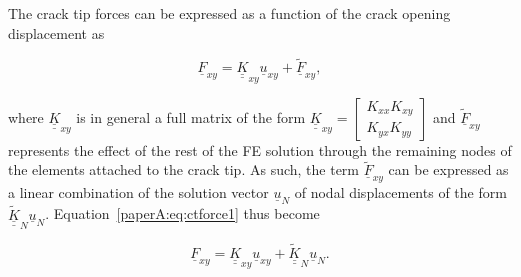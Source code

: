 The crack tip forces can be expressed as a function of the crack opening displacement as

\begin{equation}\label{paperA:eq:ctforce1}
\underline{F}_{xy}=\underline{\underline{K}}_{xy}\underline{u}_{xy}+\underline{\widetilde{F}}_{xy},
\end{equation}

where $\underline{\underline{K}}_{xy}$ is in general a full matrix of the form $\underline{\underline{K}}_{xy}=\begin{bmatrix}
K_{xx}  K_{xy}\\
K_{yx}  K_{yy}
\end{bmatrix}$ and $\underline{\widetilde{F}}_{xy}$ represents the effect of the rest of the FE solution through the remaining nodes of the elements attached to the crack tip. As such, the term $\underline{\widetilde{F}}_{xy}$ can be expressed as a linear combination of the solution vector $\underline{u}_{N}$ of nodal displacements of the form $\underline{\underline{\widetilde{K}}}_{N}\underline{u}_{N}$. Equation~\ref{paperA:eq:ctforce1} thus become

\begin{equation}\label{paperA:eq:ctforce2}
\underline{F}_{xy}=\underline{\underline{K}}_{xy}\underline{u}_{xy}+\underline{\underline{\widetilde{K}}}_{N}\underline{u}_{N}.
\end{equation}

